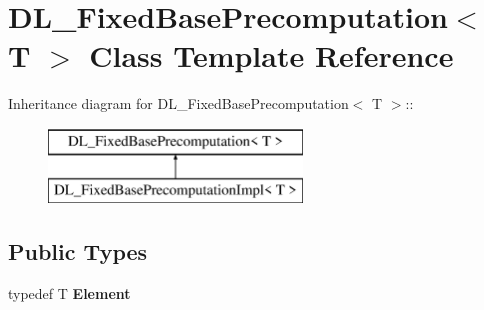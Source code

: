\hypertarget{class_d_l___fixed_base_precomputation}{
\section{DL\_\-FixedBasePrecomputation$<$ T $>$ Class Template Reference}
\label{class_d_l___fixed_base_precomputation}
}
Inheritance diagram for DL\_\-FixedBasePrecomputation$<$ T $>$::\begin{figure}[H]
\begin{center}
\leavevmode
\includegraphics[height=2cm]{class_d_l___fixed_base_precomputation}
\end{center}
\end{figure}
\subsection*{Public Types}
\begin{DoxyCompactItemize}
\item 
\hypertarget{class_d_l___fixed_base_precomputation_a5d0a97b7a92644dda0c571f65c904879}{
typedef T {\bfseries Element}}
\label{class_d_l___fixed_base_precomputation_a5d0a97b7a92644dda0c571f65c904879}

\end{DoxyCompactItemize}
